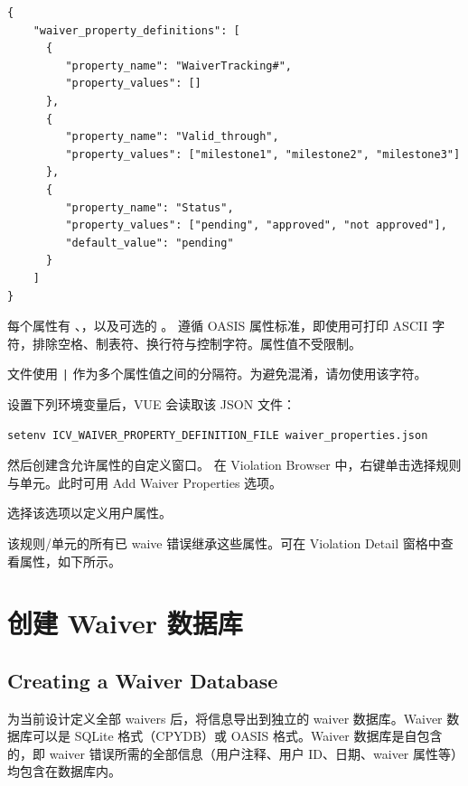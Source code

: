 \begin{lstlisting}[style=shell,caption={JSON 属性文件（waiver\_properties.json）},label={ex:waiver-props-json}]
{
    "waiver_property_definitions": [
      {
         "property_name": "WaiverTracking#",
         "property_values": []
      },
      {
         "property_name": "Valid_through",
         "property_values": ["milestone1", "milestone2", "milestone3"]
      },
      {
         "property_name": "Status",
         "property_values": ["pending", "approved", "not approved"],
         "default_value": "pending"
      }
    ]
}
\end{lstlisting}

每个属性有 、，以及可选的 。
 遵循 OASIS 属性标准，即使用可打印 ASCII 字符，排除空格、制表符、换行符与控制字符。属性值不受限制。

\begin{noteBox}
 文件使用 \texttt{|} 作为多个属性值之间的分隔符。为避免混淆，请勿使用该字符。
\end{noteBox}

设置下列环境变量后，VUE 会读取该 JSON 文件：
\begin{lstlisting}[style=shell]
setenv ICV_WAIVER_PROPERTY_DEFINITION_FILE waiver_properties.json
\end{lstlisting}

然后创建含允许属性的自定义窗口。
在 Violation Browser 中，右键单击选择规则与单元。此时可用 Add Waiver Properties 选项。


选择该选项以定义用户属性。

该规则/单元的所有已 waive 错误继承这些属性。可在 Violation Detail 窗格中查看属性，如下所示。

\section{创建 Waiver 数据库}
\subsection*{Creating a Waiver Database}

为当前设计定义全部 waivers 后，将信息导出到独立的 waiver 数据库。Waiver 数据库可以是 SQLite 格式（CPYDB）或 OASIS 格式。Waiver 数据库是自包含的，即 waiver 错误所需的全部信息（用户注释、用户 ID、日期、waiver 属性等）均包含在数据库内。

